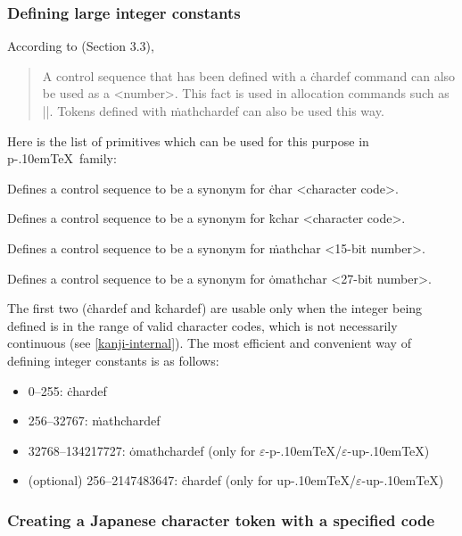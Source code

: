 \documentclass[a4paper,11pt,dvipdfmx]{article}
\def\eTeXpre{$\varepsilon$-}
\def\epTeX{\leavevmode\hbox{\eTeXpre\pTeX}}
\def\eupTeX{\leavevmode\hbox{\eTeXpre\upTeX}}
\def\pTeX{p\kern-.10em\TeX}\def\upTeX{u\pTeX}
\begin{document}
\subsubsection{Defining large integer constants}
\label{chardef}

According to \cite{topic} (Section 3.3),
\begin{quote}
A control sequence that has been defined with a \.{chardef} command
can also be used as a <number>.
This fact is used in allocation commands such as |\newbox|.
Tokens defined with \.{mathchardef} can also be used this way.
\end{quote}
Here is the list of primitives which can be used for this purpose
in \pTeX\ family:
\begin{simplelist}
 \csitem[\.{chardef} <control sequence>=<character code>]
  Defines a control sequence to be a synonym for
  \.{char} <character code>.

 \csitem[\.{kchardef} <control sequence>=<character code> (for \upTeX/\eupTeX)]
  Defines a control sequence to be a synonym for
  \.{kchar} <character code>.

 \csitem[\.{mathchardef} <control sequence>=<15-bit number>]
  Defines a control sequence to be a synonym for
  \.{mathchar} <15-bit number>.

 \csitem[\.{omathchardef} <control sequence>=<27-bit number> (for \epTeX/\eupTeX)]
  Defines a control sequence to be a synonym for
  \.{omathchar} <27-bit number>.
\end{simplelist}

The first two (\.{chardef} and \.{kchardef}) are usable only when
the integer being defined is in the range of valid character codes,
which is not necessarily continuous (see \ref{kanji-internal}).
The most efficient and convenient way of defining integer constants
is as follows:
\begin{itemize}
 \item 0--255: \.{chardef}
 \item 256--32767: \.{mathchardef}
 \item 32768--134217727: \.{omathchardef} (only for \epTeX/\eupTeX)
 \item (optional) 256--2147483647: \.{chardef} (only for \upTeX/\eupTeX)
\end{itemize}

\subsubsection{Creating a Japanese character token with a specified code}
\end{document}
